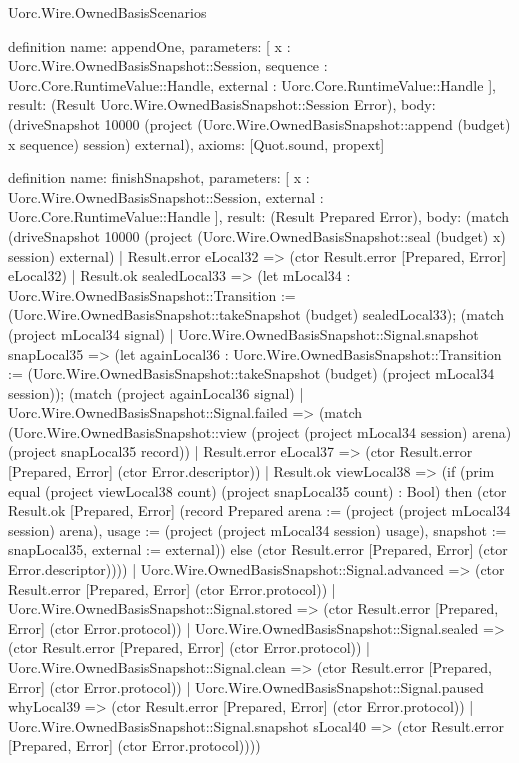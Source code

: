 \begin{lexlean}{Uorc.Wire.OwnedBasisScenarios}
\begin{semanticmodule}
definition{
  name: appendOne,
  parameters: [
    x : Uorc.Wire.OwnedBasisSnapshot::Session,
    sequence : Uorc.Core.RuntimeValue::Handle,
    external : Uorc.Core.RuntimeValue::Handle
  ],
  result: (Result Uorc.Wire.OwnedBasisSnapshot::Session Error),
  body: (driveSnapshot 10000 (project (Uorc.Wire.OwnedBasisSnapshot::append (budget) x sequence) session) external),
  axioms: [Quot.sound, propext]
}

definition{
  name: finishSnapshot,
  parameters: [
    x : Uorc.Wire.OwnedBasisSnapshot::Session,
    external : Uorc.Core.RuntimeValue::Handle
  ],
  result: (Result Prepared Error),
  body: (match (driveSnapshot 10000 (project (Uorc.Wire.OwnedBasisSnapshot::seal (budget) x) session) external)
    | Result.error eLocal32 => (ctor Result.error [Prepared, Error] eLocal32)
    | Result.ok sealedLocal33 => (let mLocal34 : Uorc.Wire.OwnedBasisSnapshot::Transition := (Uorc.Wire.OwnedBasisSnapshot::takeSnapshot (budget) sealedLocal33); (match (project mLocal34 signal)
      | Uorc.Wire.OwnedBasisSnapshot::Signal.snapshot snapLocal35 => (let againLocal36 : Uorc.Wire.OwnedBasisSnapshot::Transition := (Uorc.Wire.OwnedBasisSnapshot::takeSnapshot (budget) (project mLocal34 session)); (match (project againLocal36 signal)
        | Uorc.Wire.OwnedBasisSnapshot::Signal.failed => (match (Uorc.Wire.OwnedBasisSnapshot::view (project (project mLocal34 session) arena) (project snapLocal35 record))
          | Result.error eLocal37 => (ctor Result.error [Prepared, Error] (ctor Error.descriptor))
          | Result.ok viewLocal38 => (if (prim equal (project viewLocal38 count) (project snapLocal35 count) : Bool) then (ctor Result.ok [Prepared, Error] (record Prepared {arena := (project (project mLocal34 session) arena), usage := (project (project mLocal34 session) usage), snapshot := snapLocal35, external := external})) else (ctor Result.error [Prepared, Error] (ctor Error.descriptor))))
        | Uorc.Wire.OwnedBasisSnapshot::Signal.advanced => (ctor Result.error [Prepared, Error] (ctor Error.protocol))
        | Uorc.Wire.OwnedBasisSnapshot::Signal.stored => (ctor Result.error [Prepared, Error] (ctor Error.protocol))
        | Uorc.Wire.OwnedBasisSnapshot::Signal.sealed => (ctor Result.error [Prepared, Error] (ctor Error.protocol))
        | Uorc.Wire.OwnedBasisSnapshot::Signal.clean => (ctor Result.error [Prepared, Error] (ctor Error.protocol))
        | Uorc.Wire.OwnedBasisSnapshot::Signal.paused whyLocal39 => (ctor Result.error [Prepared, Error] (ctor Error.protocol))
        | Uorc.Wire.OwnedBasisSnapshot::Signal.snapshot sLocal40 => (ctor Result.error [Prepared, Error] (ctor Error.protocol))))
}
\end{semanticmodule}
\end{lexlean}

